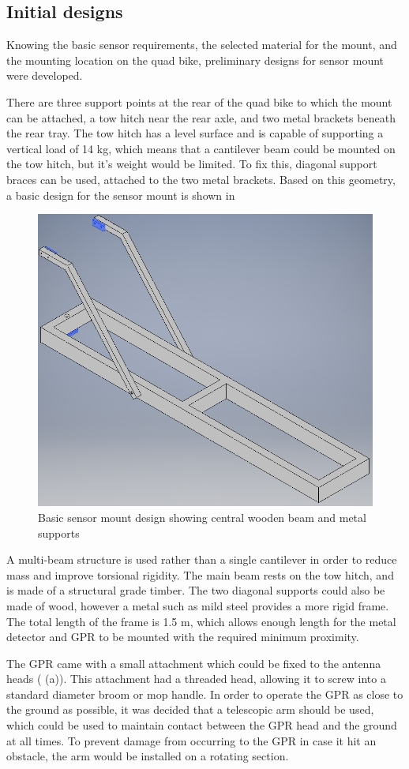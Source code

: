 \documentclass[main.tex]{subfiles}
\begin{document}
\subsection{Initial designs}
Knowing the basic sensor requirements, the selected material for the mount, and the mounting location on the quad bike, preliminary designs for sensor mount were developed. 

There are three support points at the rear of the quad bike to which the mount can be attached, a tow hitch near the rear axle, and two metal brackets beneath the rear tray. The tow hitch has a level surface and is capable of supporting a vertical load of 14 kg, which means that a cantilever beam could be mounted on the tow hitch, but it's weight would be limited. To fix this, diagonal support braces can be used, attached to the two metal brackets. Based on this geometry, a basic design for the sensor mount is shown in 

\begin{figure}[ht]
\includegraphics[width=.65\textwidth]{3-ConceptDesign/basic.PNG}
\centering
\caption[Basic sensor mount design]{Basic sensor mount design showing central wooden beam and metal supports}
\end{figure}

A multi-beam structure is used rather than a single cantilever in order to reduce mass and improve torsional rigidity. The main beam rests on the tow hitch, and is made of a structural grade timber. The two diagonal supports could also be made of wood, however a metal such as mild steel provides a more rigid frame. The total length of the frame is 1.5 m, which allows enough length for the metal detector and GPR to be mounted with the required minimum proximity. 

The GPR came with a small attachment which could be fixed to the antenna heads ( (a)). This attachment had a threaded head, allowing it to screw into a standard diameter broom or mop handle. In order to operate the GPR as close to the ground as possible, it was decided that a telescopic arm should be used, which could be used to maintain contact between the GPR head and the ground at all times. To prevent damage from occurring to the GPR in case it hit an obstacle, the arm would be installed on a rotating section.
\end{document}

